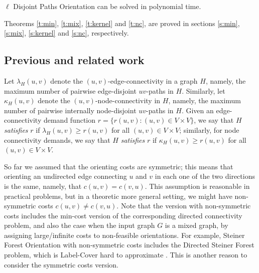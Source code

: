 \documentclass[envcountsame]{llncs}
\begin{document}
\begin{theorem} \label{t:nc}
{\sf $\ell$ Disjoint Paths Orientation} can be solved in polynomial time.
\end{theorem}

Theorems \ref{t:min}, \ref{t:mix}, \ref{t:kernel} and \ref{t:nc}, 
are proved in
sections \ref{s:min}, \ref{s:mix}, \ref{s:kernel} and \ref{s:nc}, 
respectively.


\subsection{Previous and related work}

Let $\lambda_H(u,v)$ denote the $(u,v)$-edge-connectivity in a graph $H$,
namely, the ma\-xi\-mum number of pairwise edge-disjoint $uv$-paths in $H$.
Similarly, let $\kappa_H(u,v)$ denote the $(u,v)$-node-connectivity in $H$, 
namely, the maximum number of pairwise internally node-disjoint $uv$-paths in $H$.
Given an edge-connectivity demand function $r=\{r(u,v):(u,v) \in V \times V\}$, we say that 
$H$ {\em satisfies} $r$ if $\lambda_H(u,v) \geq	r(u,v)$ for all $(u,v) \in V \times V$; similarly, 
for node connectivity demands, we say that $H$ {\em satisfies} $r$ 
if $\kappa_H(u,v) \geq	r(u,v)$ for all $(u,v) \in V \times V$.

\vspace{0.1cm}

\begin{center} 
\end{center}

\vspace{0.1cm}

So far we assumed that the orienting costs are symmetric; 
this means that orienting an undirected edge connecting $u$ and $v$ 
in each one of the two directions is the same, namely, that $c(u,v)=c(v,u)$.
This assumption is reasonable in practical problems,  
but in a theoretic more general setting, we might have non-symmetric costs $c(u,v) \neq c(v,u)$.
Note that the version with non-symmetric costs includes the min-cost version 
of the corresponding directed connectivity problem, and also the case when the input graph 
$G$ is a mixed graph, by assigning large/infinite costs to non-feasible orientations.
For example, {\sf Steiner Forest Orientation} with non-symmetric costs 
includes the {\sf Directed Steiner Forest} problem,
which is {\sf Label-Cover} hard to approximate \cite{DK}.
This is another reason to consider the symmetric costs version.
\end{document}
